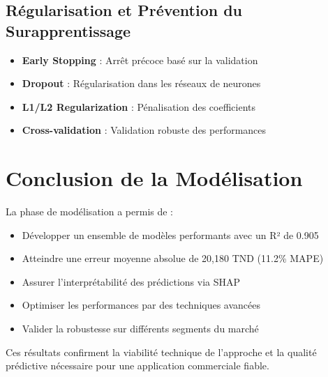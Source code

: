 \subsection{Régularisation et Prévention du Surapprentissage}

\begin{itemize}
    \item \textbf{Early Stopping} : Arrêt précoce basé sur la validation
    \item \textbf{Dropout} : Régularisation dans les réseaux de neurones
    \item \textbf{L1/L2 Regularization} : Pénalisation des coefficients
    \item \textbf{Cross-validation} : Validation robuste des performances
\end{itemize}

\section{Conclusion de la Modélisation}

La phase de modélisation a permis de :

\begin{itemize}
    \item Développer un ensemble de modèles performants avec un R² de 0.905
    \item Atteindre une erreur moyenne absolue de 20,180 TND (11.2\% MAPE)
    \item Assurer l'interprétabilité des prédictions via SHAP
    \item Optimiser les performances par des techniques avancées
    \item Valider la robustesse sur différents segments du marché
\end{itemize}

Ces résultats confirment la viabilité technique de l'approche et la qualité prédictive nécessaire pour une application commerciale fiable.
